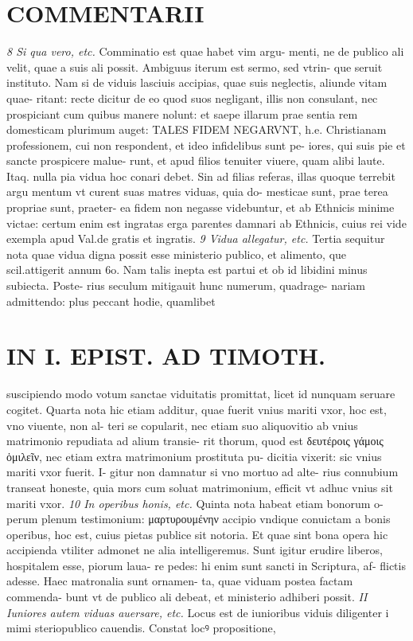 \documentclass{article}
\begin{document}
\begin{pages}
\section*{COMMENTARII }
\marginpar{[ p.126 ]}
\textit{8 Si qua vero, etc. }\pstart Comminatio est quae habet vim argu- menti, ne de publico ali velit, quae a suis ali possit. Ambiguus iterum est sermo, sed vtrin- que seruit instituto. Nam si de viduis lasciuis accipias, quae suis neglectis, aliunde vitam quae- ritant: recte dicitur de eo quod suos negligant, illis non consulant, nec prospiciant cum quibus  manere nolunt: et saepe illarum prae sentia rem domesticam plurimum auget: TALES FIDEM NEGARVNT, h.e. Christianam professionem, cui non respondent, et ideo infidelibus sunt pe- iores, qui suis pie et sancte prospicere malue- runt, et apud filios tenuiter viuere, quam alibi laute. Itaq. nulla pia vidua hoc conari debet. Sin ad filias referas, illas quoque terrebit argu mentum vt curent suas matres viduas, quia do- mesticae sunt, prae terea propriae sunt, praeter- ea fidem non negasse videbuntur, et ab Ethnicis minime victae: certum enim est ingratas erga parentes damnari ab Ethnicis, cuius rei vide exempla apud Val.de gratis et ingratis.  \pend
\textit{9 Vidua allegatur, etc. }\pstart Tertia sequitur nota quae vidua digna possit esse ministerio publico, et alimento, que scil.attigerit annum 6o. Nam talis inepta est partui et ob id libidini minus subiecta. Poste- rius seculum mitigauit hunc numerum, quadrage- nariam admittendo: plus peccant hodie, quamlibet  \pend
\section*{IN I. EPIST. AD TIMOTH. }
\marginpar{[ p.127 ]}\pstart suscipiendo modo votum sanctae viduitatis promittat, licet id nunquam seruare cogitet.  \pend\pstart Quarta nota hic etiam additur, quae fuerit vnius mariti vxor, hoc est, vno viuente, non al- teri se copularit, nec etiam suo aliquovitio ab vnius matrimonio repudiata ad alium transie- rit thorum, quod est δευτέροις γάμοις ὁμιλεῖν, nec etiam extra matrimonium prostituta pu- dicitia vixerit: sic vnius mariti vxor fuerit. I- gitur non damnatur si vno mortuo ad alte- rius connubium transeat honeste, quia mors cum soluat matrimonium, efficit vt adhuc vnius sit mariti vxor.  \pend
\textit{10 In operibus honis, etc. }\pstart Quinta nota habeat etiam bonorum o- perum plenum testimonium: μαρτυρουμένην accipio vndique conuictam a bonis operibus, hoc est, cuius pietas publice sit notoria. Et quae sint bona opera hic accipienda vtiliter admonet ne alia intelligeremus. Sunt igitur erudire liberos, hospitalem esse, piorum laua- re pedes: hi enim sunt sancti in Scriptura, af- flictis adesse. Haec matronalia sunt ornamen- ta, quae viduam postea factam commenda- bunt vt de publico ali debeat, et ministerio adhiberi possit.  \pend
\textit{II Iuniores autem viduas auersare, etc. }\pstart Locus est de iunioribus  viduis diligenter i mimi steriopublico cauendis. Constat locꝰ propositione,  \pend

\end{pages}
\end{document}
